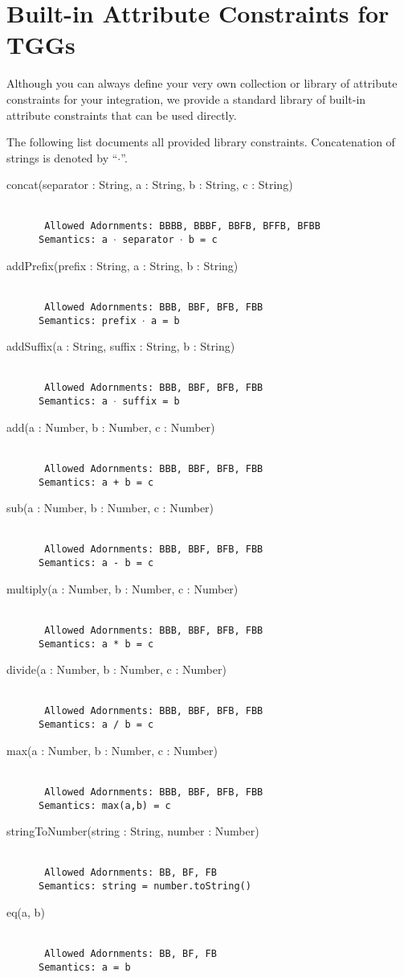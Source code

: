 \section{Built-in Attribute Constraints for TGGs}
\label{chap:libraryConstraints}
	
Although you can always define your very own collection or library of attribute constraints for your integration, we provide a standard library of built-in attribute constraints that can be used directly.	
	
The following list documents all provided library constraints. 
Concatenation of strings is denoted by ``$\cdot$''. 
	
\begin{description}
\item[concat(separator : String, a : String, b : String, c : String)]~\\
\texttt{
Allowed Adornments: BBBB, BBBF, BBFB, BFFB, BFBB \\
Semantics: a $\cdot$ separator $\cdot$ b = c
} 
\item[addPrefix(prefix : String, a : String, b : String)]~\\
\texttt{
Allowed Adornments: BBB, BBF, BFB, FBB  \\
Semantics: prefix $\cdot$ a = b
}
\item[addSuffix(a : String, suffix : String, b : String)]~\\
\texttt{
Allowed Adornments: BBB, BBF, BFB, FBB \\
Semantics: a $\cdot$ suffix = b 
}
\item[add(a : Number, b : Number, c : Number)]~\\
\texttt{
Allowed Adornments: BBB, BBF, BFB, FBB \\
Semantics: a + b = c
} 
\item[sub(a : Number, b : Number, c : Number)]~\\
\texttt{
Allowed Adornments: BBB, BBF, BFB, FBB \\
Semantics: a - b = c
} 
\item[multiply(a : Number, b : Number, c : Number)]~\\
\texttt{
Allowed Adornments: BBB, BBF, BFB, FBB \\
Semantics: a * b = c 
}
\item[divide(a : Number, b : Number, c : Number)]~\\
\texttt{
Allowed Adornments: BBB, BBF, BFB, FBB \\
Semantics: a / b = c 
}
\item[max(a : Number, b : Number, c : Number)]~\\
\texttt{
Allowed Adornments: BBB, BBF, BFB, FBB \\
Semantics: max(a,b) = c
}
\item[stringToNumber(string : String, number : Number)]~\\
\texttt{
Allowed Adornments: BB, BF, FB \\
Semantics: string = number.toString()
}
\item[eq(a, b)]~\\
\texttt{
Allowed Adornments: BB, BF, FB \\
Semantics: a = b 
}
\end{description}